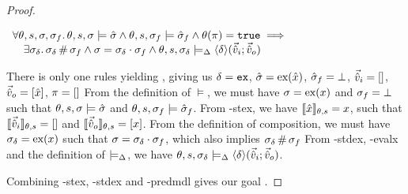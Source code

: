 \begin{proof}

\pfassume \begin{hypvlist}
 
\end{hypvlist}
\pfprove \begin{goalvlist}
 $\begin{array}{l}
\forall \theta,s,\sigma,\sigma_f\ldotp \theta,s,\sigma\models \hat{\sigma} \land \theta,s,\sigma_f\models \hat{\sigma}_f \land \theta(\pi)=\texttt{true} \implies \\
\quad \exists \sigma_\delta\ldotp \sigma_\delta\operatorname{\#}\sigma_f \land \sigma=\sigma_\delta\cdot\sigma_f \land \theta, s, \sigma_\delta \models_{\Delta} \left<\delta\right>\!(\vec{\hat{v}}_i;\vec{\hat{v}}_o)
\end{array}$
\end{goalvlist}
\begin{hypvlist}
 There is only one \consume{} rules yielding \Ok, giving us $\delta=\texttt{ex}$, $\hat{\sigma}=\text{ex}(\hat{x})$, $\hat{\sigma}_f=\bot$, $\vec{\hat{v}}_i=[]$, $\vec{\hat{v}}_o=[\hat{x}]$, $\pi=[]$
 From the definition of $\models$, we must have $\sigma=\text{ex}(x)$ and $\sigma_f=\bot$ such that $\theta,s,\sigma\models\hat{\sigma}$ and $\theta,s,\sigma_f\models\hat{\sigma}_f$.
 From \hyp{stex}, we have $\llbracket\hat{x}\rrbracket_{\theta,s}=x$, such that $\llbracket\vec{\hat{v}}_i\rrbracket_{\theta,s}=[]$ and $\llbracket\vec{\hat{v}}_o\rrbracket_{\theta,s}=[x]$.
 From the definition of composition, we must have $\sigma_\delta=\text{ex}(x)$ such that $\sigma=\sigma_\delta\cdot\sigma_f$, which also implies $\sigma_\delta\operatorname{\#}\sigma_f$
 From \hyp{stdex}, \hyp{evalx} and the definition of $\models_{\Delta}$, we have $\theta,s,\sigma_\delta\models_{\Delta} \left<\delta\right>\!(\vec{\hat{v}}_i;\vec{\hat{v}}_o)$.
\end{hypvlist}
Combining \hyp{stex}, \hyp{stdex} and \hyp{predmdl} gives our goal .



\end{proof}
